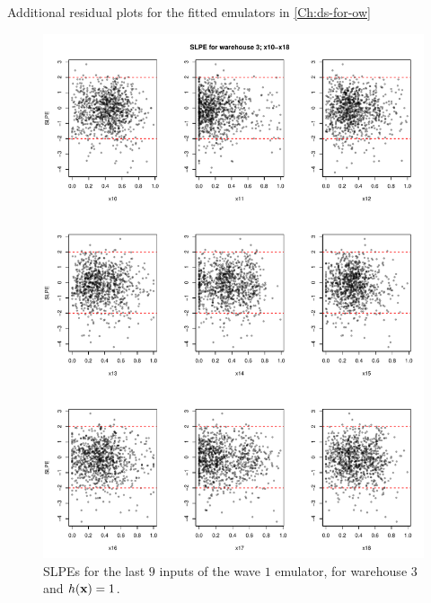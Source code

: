 \begin{chapter}{Additional residual plots  for the fitted emulators in \cref{Ch:ds-for-ow} \label{App:resid}}
\begin{figure}
  \centering
  \includegraphics[width=\textwidth]{fig-app-ds/w1-w3-2.pdf}
  \caption{SLPEs for the last $9$ inputs of the wave $1$ emulator, for warehouse $3$ and $h(\mathbf{x}) = 1$.}
\end{figure}
\newpage

\end{chapter}
